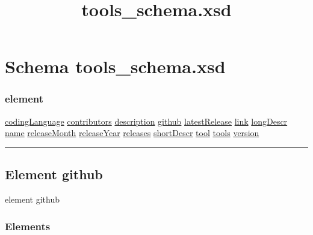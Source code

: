 \documentclass[
]{article}
\title{tools\_schema.xsd}
\author{}
\date{}
\begin{document}
\maketitle

\hypertarget{schema-tools_schema.xsd}{%
\section{\texorpdfstring{Schema {tools\_schema.xsd
}}{Schema tools\_schema.xsd }}\label{schema-tools_schema.xsd}}

\hypertarget{element}{%
\subsubsection{element}\label{element}}

\protect\hyperlink{element_codingLanguage}{codingLanguage} \textbar{}
\protect\hyperlink{element_contributors}{contributors} \textbar{}
\protect\hyperlink{element_description}{description} \textbar{}
\protect\hyperlink{element_github}{github} \textbar{}
\protect\hyperlink{element_latestRelease}{latestRelease} \textbar{}
\protect\hyperlink{element_link}{link} \textbar{}
\protect\hyperlink{element_longDescr}{longDescr} \textbar{}
\protect\hyperlink{element_name}{name} \textbar{}
\protect\hyperlink{element_releaseMonth}{releaseMonth} \textbar{}
\protect\hyperlink{element_releaseYear}{releaseYear} \textbar{}
\protect\hyperlink{element_releases}{releases} \textbar{}
\protect\hyperlink{element_shortDescr}{shortDescr} \textbar{}
\protect\hyperlink{element_tool}{tool} \textbar{}
\protect\hyperlink{element_tools}{tools} \textbar{}
\protect\hyperlink{element_version}{version}

\begin{center}\rule{0.5\linewidth}{0.5pt}\end{center}

\protect\hypertarget{element_github}{}{}

\hypertarget{element-github}{%
\subsection{\texorpdfstring{Element { github
}}{Element  github }}\label{element-github}}

{element github}

\hypertarget{elements}{%
\subsubsection{Elements}\label{elements}}
\end{document}

